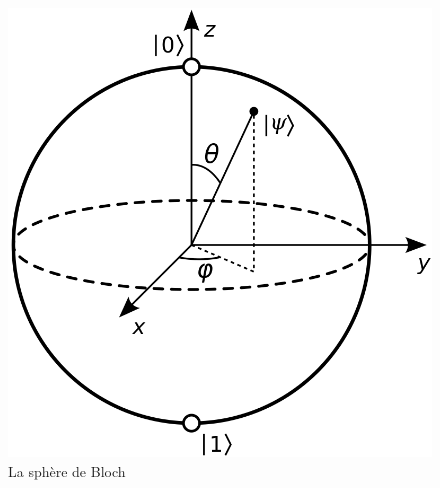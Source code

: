 \begin{figure}
\centering
\includegraphics[scale=0.2]{Bloch_sphere}
\caption{La sphère de Bloch}
\label{fig:Bloch}
\end{figure}

